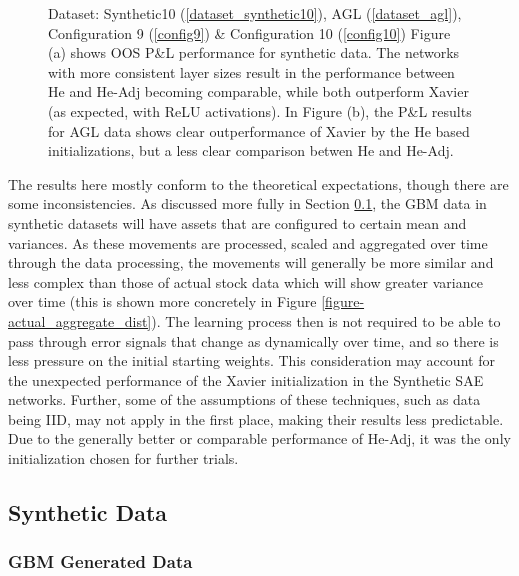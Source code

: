 \documentclass[a4paper,11pt,oneside]{article}
\theoremstyle{plain}
\theoremstyle{definition}
\begin{document}
\begin{figure}[H]
		\caption[OOS P\&L by Weight Initialization]
		{Dataset: Synthetic10 (\ref{dataset_synthetic10}), AGL (\ref{dataset_agl}), Configuration 9 (\ref{config9}) \& Configuration 10 (\ref{config10})
			\newline Figure (a) shows OOS P\&L performance for synthetic data. The networks with more consistent layer sizes result in the performance between He and He-Adj becoming comparable, while both outperform Xavier (as expected, with ReLU activations). In Figure (b), the P\&L results for AGL data shows clear outperformance of Xavier by the He based initializations, but a less clear comparison betwen He and He-Adj.}
		\label{figure-pl_init}
	\end{figure}
	
	
	The results here mostly conform to the theoretical expectations, though there are some inconsistencies. As discussed more fully in Section \ref{results_synth}, the GBM data in synthetic datasets will have assets that are configured to certain mean and variances. As these movements are processed, scaled and aggregated over time through the data processing, the movements will generally be more similar and less complex than those of actual stock data which will show greater variance over time (this is shown more concretely in Figure \ref{figure-actual_aggregate_dist}). The learning process then is not required to be able to pass through error signals that change as dynamically over time, and so there is less pressure on the initial starting weights. This consideration may account for the unexpected performance of the Xavier initialization in the Synthetic SAE networks. Further, some of the assumptions of these techniques, such as data being IID, may not apply in the first place, making their results less predictable.  Due to the generally better or comparable performance of He-Adj, it was the only initialization chosen for further trials.  \newline
	
	\newpage
	\subsection{Synthetic Data}\label{results_synth}
	
	\subsubsection{GBM Generated Data}\label{results_gbm_data}
	
\end{document}

